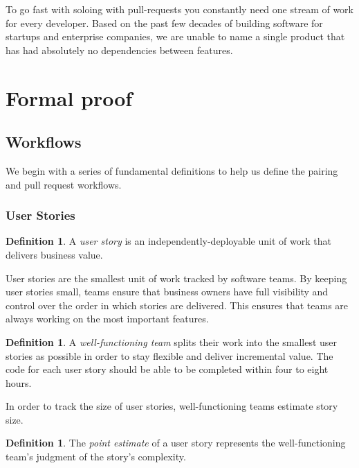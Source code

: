 \documentclass[letterpaper]{article}
\theoremstyle{definition}
\newtheorem{definition}[theorem]{Definition}
\begin{document}
    To go fast with soloing with pull-requests you constantly need one stream of work for every developer.
    Based on the past few decades of building software for startups and enterprise companies, we are unable to name a
    single product that has had absolutely no dependencies between features.


    \section{Formal proof}\label{sec:formal-proof}

    \subsection{Workflows}\label{subsec:workflows}

    We begin with a series of fundamental definitions to help us define the pairing and pull request workflows.

    \subsubsection{User Stories}\label{subsubsec:user-stories}

    \begin{definition}
        A \textit{user story} is an independently-deployable unit of work that delivers business value.
    \end{definition}

    User stories are the smallest unit of work tracked by software teams.
    By keeping user stories small, teams ensure that business owners have full visibility and control over the order
    in which stories are delivered.
    This ensures that teams are always working on the most important features.

    \begin{definition}
        A \textit{well-functioning team} splits their work into the smallest user stories as possible in order to stay
        flexible and deliver incremental value.
        The code for each user story should be able to be completed within four to eight hours.
    \end{definition}

    In order to track the size of user stories, well-functioning teams estimate story size.

    \begin{definition}
        The \textit{point estimate} of a user story represents the well-functioning team's judgment of the story's
        complexity.
    \end{definition}
\end{document}
